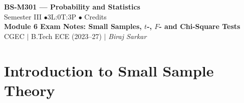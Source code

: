 \documentclass[12pt,a4paper]{article}
\begin{document}
\begin{center}
  {\LARGE\bfseries\color{myred} BS-M301 --- Probability and Statistics}\\[5pt]
  {\normalsize\color{mydark} Semester III \quad$\bullet$\quad 3L:0T:3P \quad$\bullet$ Credits}\\[3pt]
  {\normalsize\color{myteal}\textbf{Module 6 Exam Notes: Small Samples, $t$-, $F$- and Chi-Square Tests}}\\[3pt]
  {\small\color{mydark} CGEC \;$|$\; B.Tech ECE (2023--27) \;$|$\; \textit{Biraj Sarkar}}
\end{center}
\vspace{2pt}
\noindent{\color{myred}\rule{\linewidth}{1.5pt}}
\vspace{2pt}

\hypersetup{linkcolor=mydark}
\tableofcontents
\hypersetup{linkcolor=myteal}
\newpage

\section{Introduction to Small Sample Theory}
\end{document}
